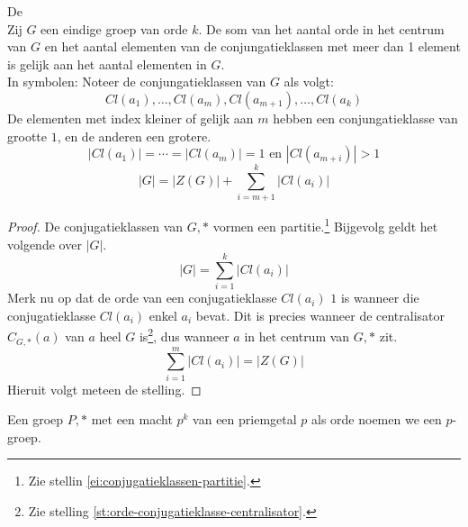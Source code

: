 \documentclass[main.tex]{subfiles}
\begin{document}
\begin{st}
  \label{st:klasvergelijking}
  De \\
  Zij $G$ een eindige groep van orde $k$.
  De som van het aantal orde in het centrum van $G$ en het aantal elementen van de conjungatieklassen met meer dan 1 element is gelijk aan het aantal elementen in $G$.\\
  In symbolen: Noteer de conjungatieklassen van $G$ als volgt:
  \[ Cl(a_{1}),\dotsc, Cl(a_{m}), Cl(a_{m+1}), \dotsc, Cl(a_{k}) \]
  De elementen met index kleiner of gelijk aan $m$ hebben een conjungatieklasse van grootte $1$, en de anderen een grotere.
  \[ |Cl(a_{1})| = \dotsb = |Cl(a_{m})| = 1 \text{ en } |Cl(a_{m+i})| > 1\]
  \[ |G| = |Z(G)| + \sum_{i=m+1}^{k}|Cl(a_{i})| \]

  \begin{proof}
    De conjugatieklassen van $G,*$ vormen een partitie.\footnote{Zie stellin \ref{ei:conjugatieklassen-partitie}.}
    Bijgevolg geldt het volgende over $|G|$.
    \[ |G| = \sum_{i=1}^{k}|Cl(a_{i})| \]
    Merk nu op dat de orde van een conjugatieklasse $Cl(a_{i})$ $1$ is wanneer die conjugatieklasse $Cl(a_{i})$ enkel $a_{i}$ bevat.
    Dit is precies wanneer de centralisator $C_{G,*}(a)$ van $a$ heel $G$ is\footnote{Zie stelling \ref{st:orde-conjugatieklasse-centralisator}.}, dus wanneer $a$ in het centrum van $G,*$ zit.
    \[ \sum_{i=1}^{m}|Cl(a_{i})| = |Z(G)| \]
    Hieruit volgt meteen de stelling.
  \end{proof}
\end{st}

\begin{de}
  Een groep $P,*$ met een macht $p^{k}$ van een priemgetal $p$ als orde noemen we een $p$-groep.
\end{de}
\end{document}
